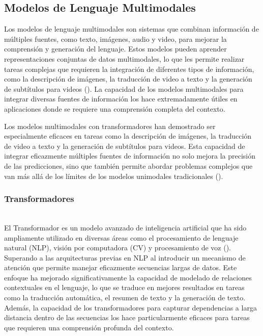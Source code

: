 \subsection{Modelos de Lenguaje Multimodales}
Los modelos de lenguaje multimodales son sistemas que combinan información de múltiples fuentes, como texto, imágenes, audio y video, para mejorar la comprensión y generación del lenguaje. Estos modelos pueden aprender representaciones conjuntas de datos multimodales, lo que les permite realizar tareas complejas que requieren la integración de diferentes tipos de información, como la descripción de imágenes, la traducción de video a texto y la generación de subtítulos para videos (\cite{baltruvsaitis2018multimodal}). La capacidad de los modelos multimodales para integrar diversas fuentes de información los hace extremadamente útiles en aplicaciones donde se requiere una comprensión completa del contexto.

Los modelos multimodales con transformadores han demostrado ser especialmente eficaces en tareas como la descripción de imágenes, la traducción de video a texto y la generación de subtítulos para videos. Esta capacidad de integrar eficazmente múltiples fuentes de información no solo mejora la precisión de las predicciones, sino que también permite abordar problemas complejos que van más allá de los límites de los modelos unimodales tradicionales (\cite{xu2023multimodal}).

\subsubsection{Transformadores}\hfill\\
\indent
El Transformador es un modelo avanzado de inteligencia artificial que ha sido ampliamente utilizado en diversas áreas como el procesamiento de lenguaje natural (NLP), visión por computadora (CV) y procesamiento de voz (\cite{lin2022survey}). Superando a las arquitecturas previas en NLP al introducir un mecanismo de atención que permite manejar eficazmente secuencias largas de datos. Este enfoque ha mejorado significativamente la capacidad de modelado de relaciones contextuales en el lenguaje, lo que se traduce en mejores resultados en tareas como la traducción automática, el resumen de texto y la generación de texto. Además, la capacidad de los transformadores para capturar dependencias a larga distancia dentro de las secuencias los hace particularmente eficaces para tareas que requieren una comprensión profunda del contexto.

